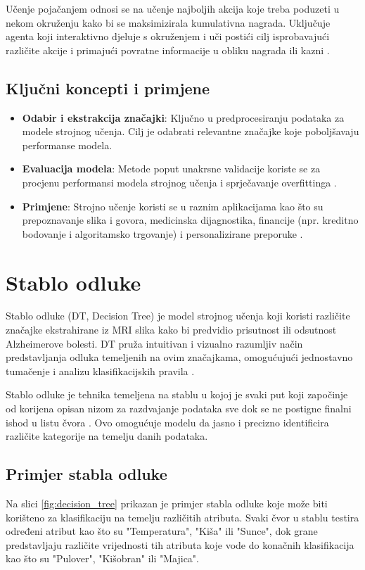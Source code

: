 \documentclass[zavrsnirad]{fer}
\begin{document}
Učenje pojačanjem odnosi se na učenje najboljih akcija koje treba poduzeti u nekom okruženju kako bi se maksimizirala kumulativna nagrada. Uključuje agenta koji interaktivno djeluje s okruženjem i uči postići cilj isprobavajući različite akcije i primajući povratne informacije u obliku nagrada ili kazni \cite{mahesh2019}.

\subsection{Ključni koncepti i primjene}

\begin{itemize}
	\item \textbf{Odabir i ekstrakcija značajki}: Ključno u predprocesiranju podataka za modele strojnog učenja. Cilj je odabrati relevantne značajke koje poboljšavaju performanse modela.
	\item \textbf{Evaluacija modela}: Metode poput unakrsne validacije koriste se za procjenu performansi modela strojnog učenja i sprječavanje overfittinga \cite{ibm_machine_learning}.
	\item \textbf{Primjene}: Strojno učenje koristi se u raznim aplikacijama kao što su prepoznavanje slika i govora, medicinska dijagnostika, financije (npr. kreditno bodovanje i algoritamsko trgovanje) i personalizirane preporuke \cite{ibm_machine_learning}.
\end{itemize}


\section{Stablo odluke}
Stablo odluke (DT, Decision Tree) je model strojnog učenja koji koristi različite značajke ekstrahirane iz MRI slika kako bi predvidio prisutnost ili odsutnost Alzheimerove bolesti. DT pruža intuitivan i vizualno razumljiv način predstavljanja odluka temeljenih na ovim značajkama, omogućujući jednostavno tumačenje i analizu klasifikacijskih pravila \cite{somvanshi2016}.

Stablo odluke je tehnika temeljena na stablu u kojoj je svaki put koji započinje od korijena opisan nizom za razdvajanje podataka sve dok se ne postigne finalni ishod u listu čvora \cite{Charbuty_Abdulazeez_2021}. Ovo omogućuje modelu da jasno i precizno identificira različite kategorije na temelju danih podataka.

\subsection{Primjer stabla odluke}
Na slici \ref{fig:decision_tree} prikazan je primjer stabla odluke koje može biti korišteno za klasifikaciju na temelju različitih atributa. Svaki čvor u stablu testira određeni atribut kao što su "Temperatura", "Kiša" ili "Sunce", dok grane predstavljaju različite vrijednosti tih atributa koje vode do konačnih klasifikacija kao što su "Pulover", "Kišobran" ili "Majica".
\end{document}
